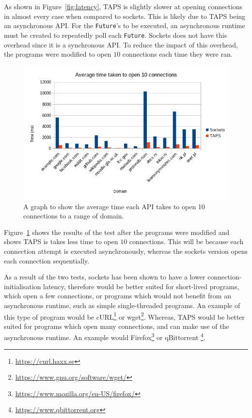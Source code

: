 As shown in Figure~\ref{fig:latency}, TAPS is slightly slower at opening connections in almost every case when compared
to sockets.
This is likely due to TAPS being an asynchronous API.
For the \texttt{Future}'s to be executed, an asynchronous runtime must be created to repeatedly poll each
\texttt{Future}.
Sockets does not have this overhead since it is a synchronous API.
To reduce the impact of this overhead, the programs were modified to open \(10\) connections each time they were ran.

\begin{figure}[h]
    \includegraphics[width=\textwidth]{../data/processed/avg_multi}
    \caption{A graph to show the average time each API takes to open 10 connections to a range of domain.}
    \label{fig:multiLatency}
\end{figure}

Figure~\ref{fig:multiLatency} shows the results of the test after the programs were modified and shows TAPS is takes
less time to open \(10\) connections.
This will be because each connection attempt is executed asynchronously, whereas the sockets version opens each
connection sequentially.

As a result of the two tests, sockets has been shown to have a lower connection-initialisation latency, therefore would
be better suited for short-lived programs, which open a few connections, or programs which would not benefit from an
asynchronous runtime, such as simple single-threaded programs.
An example of this type of program would be cURL\footnote{\url{https://curl.haxx.se}} or
wget\footnote{\url{https://www.gnu.org/software/wget/}}.
Whereas, TAPS would be better suited for programs which open many connections, and can make use of the asynchronous
runtime.
An example would Firefox\footnote{\url{https://www.mozilla.org/en-US/firefox/}} or qBittorrent
\footnote{\url{https://www.qbittorrent.org}}.

